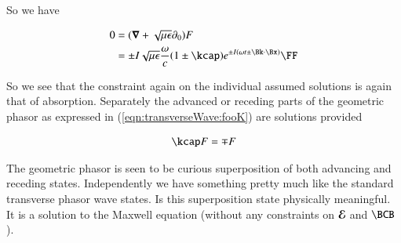 So we have

\begin{align*}
0 
&= (\spacegrad + \sqrt{\mu\epsilon}\partial_0) F \\
&= 
{\pm I}\sqrt{\mu\epsilon}\frac{\omega}{c}(1 \pm \kcap) e^{\pm I(\omega t \pm \Bk \cdot \Bx)} \FF
\end{align*}

So we see that the constraint again on the individual assumed solutions is again that of absorption.  Separately the advanced or receding parts of the geometric phasor as expressed in (\ref{eqn:transverseWave:fooK}) are solutions provided

\begin{align}\label{eqn:transverseWave:fooN}
\kcap F = \mp F
\end{align}

The geometric phasor is seen to be curious superposition of both advancing and receding states.  Independently we have something pretty much like the standard transverse phasor wave states.  Is this superposition state physically meaningful.  It is a solution to the Maxwell equation (without any constraints on $\boldsymbol{\mathcal{E}}$ and $\BCB$).

\EndArticle
